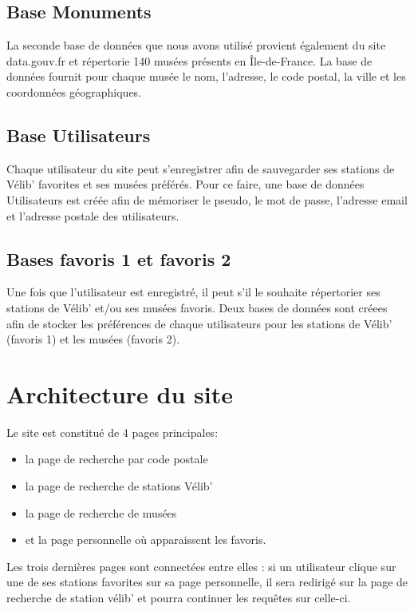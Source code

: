 \documentclass[a4paper]{article}
\begin{document}
\subsection{Base Monuments}

La seconde base de données que nous avons utilisé provient également du site data.gouv.fr et répertorie 140 musées présents en Île-de-France. La base de données fournit pour chaque musée le nom, l'adresse, le code postal, la ville et les coordonnées géographiques.

\subsection{Base Utilisateurs}

Chaque utilisateur du site peut s'enregistrer afin de sauvegarder ses stations de Vélib' favorites et ses musées préférés. Pour ce faire, une base de données Utilisateurs est créée afin de mémoriser le pseudo, le mot de passe, l'adresse email et l'adresse postale des utilisateurs. 

\subsection{Bases favoris 1 et favoris 2}

Une fois que l'utilisateur est enregistré, il peut s'il le souhaite répertorier ses stations de Vélib' et/ou ses musées favoris. Deux bases de données sont créees afin de stocker les préférences de chaque utilisateurs pour les stations de Vélib' (favoris 1) et les musées (favoris 2). 


\section{Architecture du site}
Le site est constitué de 4 pages principales: 
\begin{itemize}
\item la page de recherche par code postale
\item la page de recherche de stations Vélib'
\item la page de recherche de musées 
\item et la page personnelle où apparaissent les favoris. 
\end{itemize}

Les trois dernières pages sont connectées entre elles : si un utilisateur clique sur une de ses stations favorites sur sa page personnelle, il sera redirigé sur la page de recherche de station vélib' et pourra continuer les requêtes sur celle-ci.\\
\end{document}
